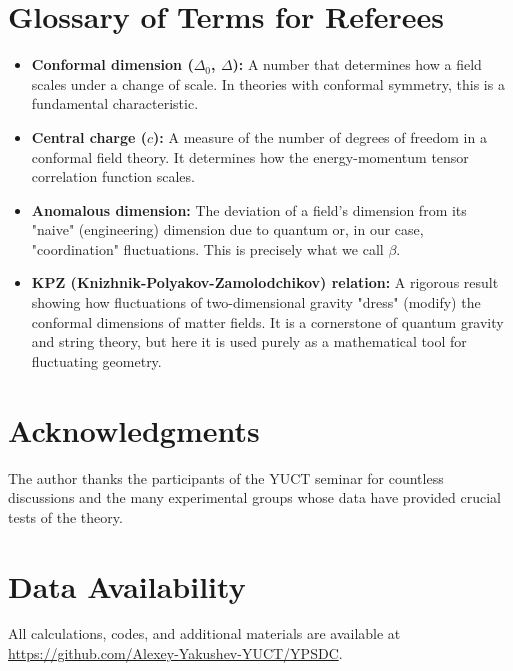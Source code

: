 \documentclass[12pt,a4paper]{article}
\begin{document}
	\section*{Glossary of Terms for Referees}
	\begin{itemize}
		\item \textbf{Conformal dimension (\(\Delta_0\), \(\Delta\)):} A number that determines how a field scales under a change of scale. In theories with conformal symmetry, this is a fundamental characteristic.
		\item \textbf{Central charge (\(c\)):} A measure of the number of degrees of freedom in a conformal field theory. It determines how the energy-momentum tensor correlation function scales.
		\item \textbf{Anomalous dimension:} The deviation of a field's dimension from its "naive" (engineering) dimension due to quantum or, in our case, "coordination" fluctuations. This is precisely what we call \(\beta\).
		\item \textbf{KPZ (Knizhnik-Polyakov-Zamolodchikov) relation:} A rigorous result showing how fluctuations of two-dimensional gravity "dress" (modify) the conformal dimensions of matter fields. It is a cornerstone of quantum gravity and string theory, but here it is used purely as a mathematical tool for fluctuating geometry.
	\end{itemize}
	
	\section*{Acknowledgments}
	The author thanks the participants of the YUCT seminar for countless discussions and the many experimental groups whose data have provided crucial tests of the theory.
	
	\section*{Data Availability}
	All calculations, codes, and additional materials are available at \url{https://github.com/Alexey-Yakushev-YUCT/YPSDC}.
	
\end{document}
